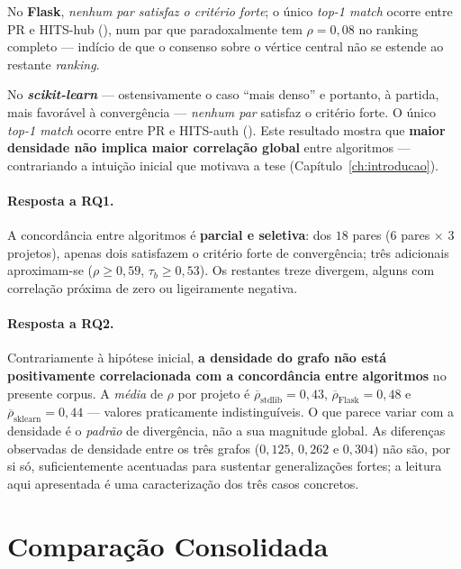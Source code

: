 No \textbf{Flask}, \emph{nenhum par satisfaz o critério forte}; o
único \emph{top-1 match} ocorre entre PR e HITS-hub
(), num par que paradoxalmente tem
$\rho = 0{,}08$ no ranking completo --- indício de que o consenso
sobre o vértice central não se estende ao restante \emph{ranking}.

No \textbf{\emph{scikit-learn}} --- ostensivamente o caso ``mais
denso'' e portanto, à partida, mais favorável à convergência ---
\emph{nenhum par} satisfaz o critério forte. O único \emph{top-1
match} ocorre entre PR e HITS-auth (). Este
resultado mostra que \textbf{maior densidade não implica maior
correlação global} entre algoritmos --- contrariando a intuição
inicial que motivava a tese (Capítulo~\ref{ch:introducao}).

\paragraph{Resposta a RQ1.} A concordância entre algoritmos é
\textbf{parcial e seletiva}: dos $18$ pares ($6$ pares
$\times$ $3$ projetos), apenas dois satisfazem o critério forte de
convergência; três adicionais aproximam-se ($\rho \geq 0{,}59$,
$\tau_b \geq 0{,}53$). Os restantes treze divergem, alguns com
correlação próxima de zero ou ligeiramente negativa.

\paragraph{Resposta a RQ2.} Contrariamente à hipótese inicial,
\textbf{a densidade do grafo não está positivamente correlacionada
com a concordância entre algoritmos} no presente corpus. A
\emph{média} de $\rho$ por projeto é
$\overline{\rho}_{\text{stdlib}} = 0{,}43$,
$\overline{\rho}_{\text{Flask}} = 0{,}48$ e
$\overline{\rho}_{\text{sklearn}} = 0{,}44$ --- valores praticamente
indistinguíveis. O que parece variar com a densidade é o
\emph{padrão} de divergência, não a sua magnitude global. As
diferenças observadas de densidade entre os três grafos ($0{,}125$,
$0{,}262$ e $0{,}304$) não são, por si só, suficientemente
acentuadas para sustentar generalizações fortes; a leitura aqui
apresentada é uma caracterização dos três casos concretos.

\section{Comparação Consolidada}
\label{sec:res-consolidada}

